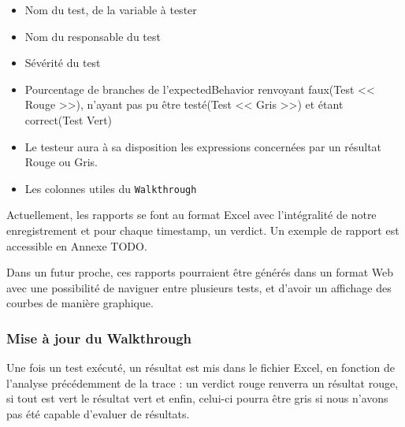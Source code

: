 	\begin{itemize}
		\item Nom du test, de la variable à tester
		\item Nom du responsable du test
		\item Sévérité du test
		\item Pourcentage de branches de l'expectedBehavior renvoyant faux(Test << Rouge >>), n'ayant pas pu être testé(Test << Gris >>) et étant correct(Test Vert)
		\item Le testeur aura à sa disposition les expressions concernées par un résultat Rouge ou Gris.
		\item Les colonnes utiles du \texttt{Walkthrough}
	\end{itemize}

	Actuellement, les rapports se font au format Excel avec l'intégralité de notre enregistrement et pour chaque timestamp, un verdict. Un exemple de rapport est accessible en Annexe TODO. 
	
	Dans un futur proche, ces rapports pourraient être générés dans un format Web avec une possibilité de naviguer entre plusieurs tests, et d'avoir un affichage des courbes de manière graphique.

	\subsubsection{Mise à jour du Walkthrough}
	Une fois un test exécuté, un résultat est mis dans le fichier Excel, en fonction de l'analyse précédemment de la trace : un verdict rouge renverra un résultat rouge, si tout est vert le résultat vert et enfin, celui-ci pourra être gris si nous n'avons pas été capable d'evaluer de résultats.
	
